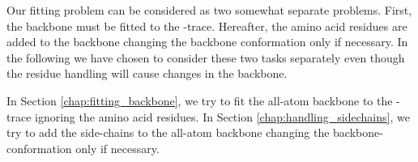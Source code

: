 Our fitting problem can be considered as two somewhat separate problems.
First, the backbone must be fitted to the \Ca-trace. 
Hereafter, the amino acid residues are added to the backbone changing the backbone conformation only if necessary.
In the following we have chosen to consider these two tasks separately even though the residue handling will cause changes in the backbone.

In Section \ref{chap:fitting_backbone}, we try to fit the all-atom backbone to the \Ca-trace ignoring the amino acid residues.
In Section \ref{chap:handling_sidechains}, we try to add the side-chains to the all-atom backbone changing the backbone-conformation only if necessary.

